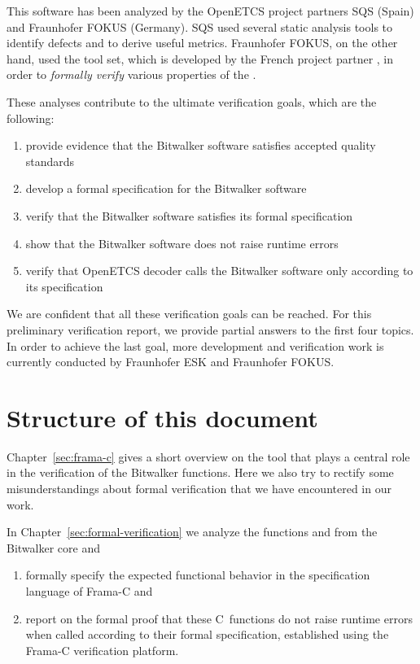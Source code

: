 This software has been analyzed by the OpenETCS project partners SQS (Spain)
and Fraunhofer FOKUS (Germany).
SQS used several static analysis tools to identify defects and to derive useful metrics.
Fraunhofer FOKUS, on the other hand, used the \framac tool set,
which is developed by the French project partner \cealist,
in order to \emph{formally verify} various properties of the \bitwalker.


These analyses contribute to the ultimate verification goals, which are the following:

\begin{enumerate}
\item provide evidence that the Bitwalker software satisfies 
      accepted quality standards
\item develop a formal specification for the Bitwalker software
\item verify that the Bitwalker software satisfies its formal specification
\item show that the Bitwalker software does not raise runtime errors
\item verify that OpenETCS decoder calls the Bitwalker software only
      according to its specification
\end{enumerate}

We are confident that all these verification goals can be reached.
For this preliminary verification report,
we provide partial answers to the first four topics.
In order to achieve the last goal, more development and verification
work is currently conducted by Fraunhofer ESK and Fraunhofer FOKUS. 

\section{Structure of this document}

Chapter~\ref{sec:frama-c} gives a short overview on the \framacwp tool
that plays a central role in the verification of the Bitwalker functions.
Here we also try to rectify some misunderstandings about formal verification
that we have encountered in our work.

In Chapter~\ref{sec:formal-verification} we analyze
the functions \peek and \poke from the Bitwalker core and
\begin{enumerate}
\item formally specify the
      expected functional behavior in the \acsl specification language of {Frama-C}
      and
\item report on the formal proof 
	that these
      C~functions do not raise runtime errors when called according to their
      formal specification, established using 
      the {Frama-C} verification platform.
\end{enumerate}


